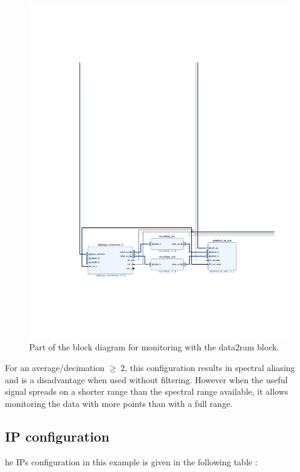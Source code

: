 \documentclass[12pt,oneside]{article}
\begin{document}
\begin{figure}[h!tb]
	\begin{center}
		\includegraphics[width=15cm,trim={4cm 5cm 4cm 18cm}, clip]{design/data2ramMoy.pdf}
		\caption{Part of the block diagram for monitoring with the data2ram block.}
		\label{fig:data2ram}
	\end{center}
\end{figure}

For an average/decimation $\geq ~2$, this configuration results in spectral aliasing and is a disadvantage when used without filtering. However when the useful signal spreads on a shorter range than the spectral range available, it allows monitoring the data with more points than with a full range. 

\vspace{0.0cm}
\subsection{IP configuration}
he IPs configuration in this example is given in the following table :
\end{document}
